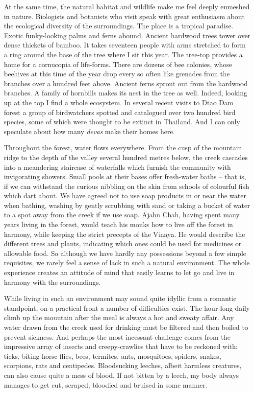 At the same time, the natural habitat and wildlife make me feel deeply
enmeshed in nature. Biologists and botanists who visit speak with great
enthusiasm about the ecological diversity of the surroundings. The place
is a tropical paradise. Exotic funky-looking palms and ferns abound. 
Ancient hardwood trees tower over dense thickets of bamboo. It takes
seventeen people with arms stretched to form a ring around the base of
the tree where I sit this year. The tree-top provides a home for a
cornucopia of life-forms. There are dozens of bee colonies, whose
beehives at this time of the year drop every so often like grenades from
the branches over a hundred feet above. Ancient ferns sprout out from
the hardwood branches. A family of hornbills makes its nest in the tree
as well. Indeed, looking up at the top I find a whole ecosystem. In
several recent visits to Dtao Dam forest a group of birdwatchers spotted
and catalogued over two hundred bird species, some of which were thought
to be extinct in Thailand. And I can only speculate about how many
\emph{devas} make their homes here. 

Throughout the forest, water flows everywhere. From the cusp of the
mountain ridge to the depth of the valley several hundred metres below, 
the creek cascades into a meandering staircase of waterfalls which
furnish the community with invigorating showers. Small pools at their
bases offer fresh-water baths -- that is, if we can withstand the
curious nibbling on the skin from schools of colourful fish which dart
about. We have agreed not to use soap products in or near the water when
bathing, washing by gently scrubbing with sand or taking a bucket of
water to a spot away from the creek if we use soap. Ajahn Chah, having
spent many years living in the forest, would teach his monks how to live
off the forest in harmony, while keeping the strict precepts of the
Vinaya. He would describe the different trees and plants, indicating
which ones could be used for medicines or allowable food. So although we
have hardly any possessions beyond a few simple requisites, we rarely
feel a sense of lack in such a natural environment. The whole experience
creates an attitude of mind that easily learns to let go and live in
harmony with the surroundings. 

While living in such an environment may sound quite idyllic from a
romantic standpoint, on a practical front a number of difficulties
exist. The hour-long daily climb up the mountain after the meal is
always a hot and sweaty affair. Any water drawn from the creek used for
drinking must be filtered and then boiled to prevent sickness. And
perhaps the most incessant challenge comes from the impressive array of
insects and creepy-crawlies that have to be reckoned with: ticks, biting
horse flies, bees, termites, ants, mosquitoes, spiders, snakes, 
scorpions, rats and centipedes. Bloodsucking leeches, albeit harmless
creatures, can also cause quite a mess of blood. If not bitten by a
leech, my body always manages to get cut, scraped, bloodied and bruised
in some manner. 

